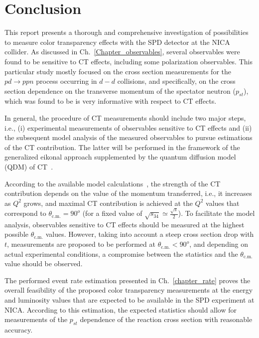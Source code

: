 \newpage
\chapter{Conclusion}
\mbox{}\vspace{-\baselineskip}

This report presents a thorough and comprehensive investigation of possibilities to measure color transparency effects with the SPD detector at the NICA collider. As discussed in Ch.~\ref{Chapter_observables}, several observables were found to be sensitive to CT effects, including some polarization observables. This particular study mostly focused on the cross section measurements for the $pd\rightarrow ppn$ process occurring in $d-d$ collisions, and specifically, on the cross section dependence on the transverse momentum of the spectator neutron ($p_{st}$), which was found to be is very informative with respect to CT effects.

In general, the procedure of CT measurements should include two major steps, i.e., (i) experimental measurements of observables sensitive to CT effects and (ii) the subsequent model analysis of the measured observables to pursue estimations of the CT contribution. The latter will be performed in the framework of the generalized eikonal approach supplemented by the quantum diffusion model (QDM) of CT~\cite{Frankfurt:1996uz,PhysRevC.107.014605,Larionov:2025equ,Farrar:1988me}.



According to the available model calculations~\cite{Frankfurt:1996uz,PhysRevC.107.014605,Larionov:2025equ,Farrar:1988me}, the strength of the CT contribution depends on the value of the momentum transferred, i.e., it increases as $Q^2$ grows, and maximal CT contribution is achieved at the $Q^{2}$ values that correspond to $\theta_{\textrm{c.m.}}=90^{o}$ (for a fixed value of $\sqrt{s_{34}}\simeq \frac{\sqrt{s}}{2}$). To facilitate the model analysis, observables sensitive to CT effects should be measured at the highest possible $\theta_{\textrm{c.m.}}$ values. However, taking into account a steep cross section drop with $t$, measurements are proposed to be performed at $\theta_{\textrm{c.m.}}<90^{o}$, and depending on actual experimental conditions, a compromise between the statistics and the $\theta_{\textrm{c.m.}}$ value should be observed.

The performed event rate estimation presented in Ch.~\ref{chapter_rate} proves the overall feasibility of the proposed color transparency measurements at the energy and luminosity values that are expected to be available in the SPD experiment at NICA. According to this estimation, the expected statistics should allow for measurements of the $p_{st}$ dependence of the reaction cross section with reasonable accuracy. 

